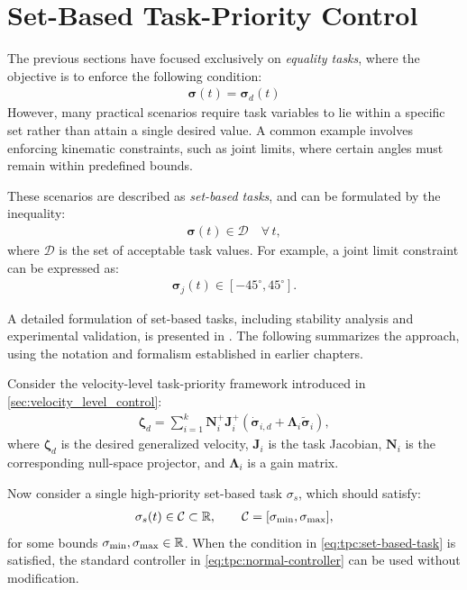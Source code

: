 \newpage
\section{Set-Based Task-Priority Control}
\label{sec:set_based_tpc}

The previous sections have focused exclusively on \emph{equality tasks}, where the objective is to enforce the following condition:
\begin{align}
    \bm{\sigma}(t) = \bm{\sigma}_d(t)
\end{align}
However, many practical scenarios require task variables to lie within a specific set rather than attain a single desired value. A common example involves enforcing kinematic constraints, such as joint limits, where certain angles must remain within predefined bounds.

These scenarios are described as \emph{set-based tasks}, and can be formulated by the inequality:
\begin{align}
    \bm{\sigma}(t) \in \mathcal{D} \quad \forall\, t,
\end{align}
where \(\mathcal{D}\) is the set of acceptable task values. For example, a joint limit constraint can be expressed as:
\begin{align}
    \bm{\sigma}_j(t) \in [-45^{\circ}, 45^{\circ}].
\end{align}

A detailed formulation of set-based tasks, including stability analysis and experimental validation, is presented in \cite{moe}. The following summarizes the approach, using the notation and formalism established in earlier chapters.

\vspace{1em}
\noindent Consider the velocity-level task-priority framework introduced in \autoref{sec:velocity_level_control}:
\begin{align}
    \bm{\zeta}_d = \sum_{i=1}^k \bm{N}_i^{+}\bm{J}_i^{+} \left(\dot{\bm{\sigma}}_{i,d} + \bm{\Lambda}_i \tilde{\bm{\sigma}}_i\right),
    \label{eq:tpc:normal-controller}
\end{align}
where \(\bm{\zeta}_d\) is the desired generalized velocity, \(\bm{J}_i\) is the task Jacobian, \(\bm{N}_i\) is the corresponding null-space projector, and \(\bm{\Lambda}_i\) is a gain matrix.

Now consider a single high-priority set-based task \(\sigma_s\), which should satisfy:
\begin{align}
    \sigma_s(t) \in \mathcal{C} \subset \mathbb{R}, \qquad \mathcal{C} = [\sigma_{\text{min}}, \sigma_{\text{max}}],
    \label{eq:tpc:set-based-task}
\end{align}
for some bounds \(\sigma_{\text{min}}, \sigma_{\text{max}} \in \mathbb{R}\). When the condition in \autoref{eq:tpc:set-based-task} is satisfied, the standard controller in \autoref{eq:tpc:normal-controller} can be used without modification.

